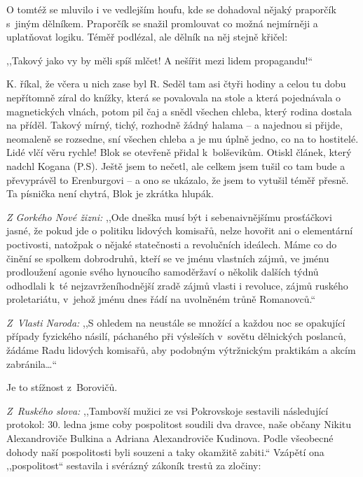 O tomtéž se mluvilo i ve vedlejším houfu, kde se dohadoval nějaký praporčík s jiným dělníkem. Praporčík se snažil promlouvat co možná nejmírněji a uplatňovat logiku. Téměř podlézal, ale dělník na něj stejně křičel:

,,Takový jako vy by měli spíš mlčet! A nešířit mezi lidem propagandu!``

K. říkal, že včera u nich zase byl R. Seděl tam asi čtyři hodiny a celou tu dobu nepřítomně zíral do knížky, která se povalovala na stole a která pojednávala o magnetických vlnách, potom pil čaj a snědl všechen chleba, který rodina dostala na příděl. Takový mírný, tichý, rozhodně žádný halama -- a  najednou si přijde, neomaleně se rozsedne, sní všechen chleba a je mu úplně jedno, co na to hostitelé. Lidé vlčí věru rychle!
Blok se otevřeně přidal k bolševikům. Otiskl článek, který nadchl Kogana (P.S). Ještě jsem to nečetl, ale celkem jsem tušil co tam bude a převyprávěl to Erenburgovi -- a ono se ukázalo, že jsem to vytušil téměř přesně. Ta písnička není chytrá, Blok je zkrátka hlupák.

\medskip

\noindent
\textit{Z Gorkého Nové žizni:} ,,Ode dneška musí být i sebenaivnějšímu prosťáčkovi jasné, že pokud jde o politiku lidových komisařů, nelze hovořit ani o elementární poctivosti, natožpak o nějaké statečnosti a revolučních ideálech. Máme co do činění se spolkem dobrodruhů, kteří se ve jménu vlastních zájmů, ve jménu prodloužení agonie svého hynoucího samoděržaví o několik dalších týdnů odhodlali k té nejzavrženíhodnější zradě zájmů vlasti i revoluce, zájmů ruského proletariátu, v jehož jménu dnes řádí na uvolněném trůně Romanovců.``

\medskip

\noindent
\textit{Z Vlasti Naroda:} ,,S ohledem na neustále se množící a každou noc se opakující případy fyzického násilí, páchaného při výsleších v sovětu dělnických poslanců, žádáme Radu lidových komisařů, aby podobným výtržnickým praktikám a akcím zabránila\ldots``

Je to stížnost z Borovičů.

\medskip

\noindent
\textit{Z Ruského slova:} ,,Tambovší mužici ze vsi Pokrovskoje sestavili následující protokol: 30. ledna jsme coby pospolitost soudili dva drav\-ce, naše občany Nikitu Alexandroviče Bulkina a Adriana Alexandroviče Kudinova. Podle všeobecné dohody naší pospolitosti byli souzeni a taky okamžitě zabiti.`` Vzápětí ona ,,pospolitost`` sestavila i svérázný zákoník trestů za zločiny:

